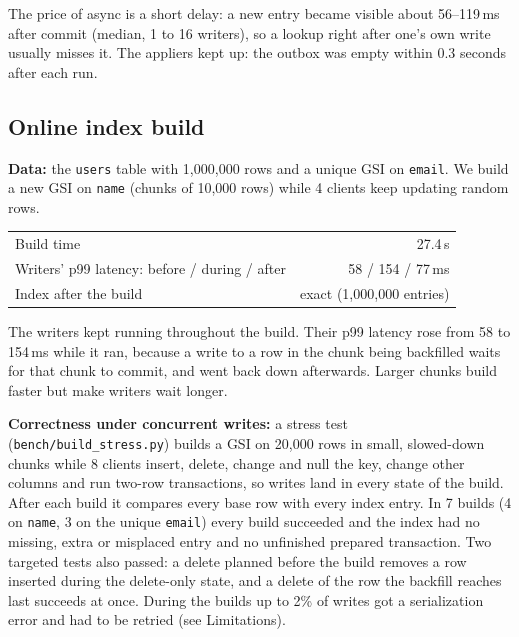 \documentclass[11pt,a4paper]{article}
\begin{document}
The price of async is a short delay: a new entry became visible about 56--119\,ms after commit (median,
1 to 16 writers), so a lookup right after one's own write usually misses it. The appliers kept up: the
outbox was empty within 0.3 seconds after each run.

\subsection{Online index build}
\textbf{Data:} the \texttt{users} table with 1,000,000 rows and a unique GSI on \texttt{email}. We build a new
GSI on \texttt{name} (chunks of 10,000 rows) while 4 clients keep updating random rows.

\begin{center}
\begin{tabular}{lr}
\toprule
Build time & 27.4\,s \\
Writers' p99 latency: before / during / after & 58 / 154 / 77\,ms \\
Index after the build & exact (1,000,000 entries) \\
\bottomrule
\end{tabular}
\end{center}
The writers kept running throughout the build. Their p99 latency rose from 58 to 154\,ms while it ran,
because a write to a row in the chunk being backfilled waits for that chunk to commit, and went back
down afterwards. Larger chunks build faster but make writers wait longer.

\textbf{Correctness under concurrent writes:} a stress test (\texttt{bench/build\_stress.py}) builds a GSI
on 20,000 rows in small, slowed-down chunks while 8 clients insert, delete, change and null the key,
change other columns and run two-row transactions, so writes land in every state of the build. After each
build it compares every base row with every index entry. In 7 builds (4 on \texttt{name}, 3 on the unique
\texttt{email}) every build succeeded and the index had no missing, extra or misplaced entry and no
unfinished prepared transaction. Two targeted tests also passed: a delete planned before the build
removes a row inserted during the delete-only state, and a delete of the row the backfill reaches last
succeeds at once. During the builds up to 2\% of writes got a serialization error and had to be retried
(see Limitations).
\end{document}

